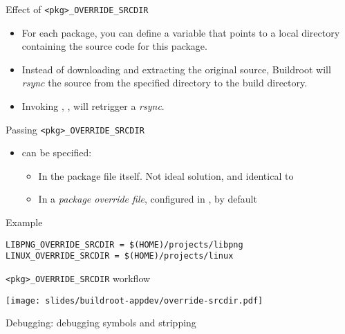 \begin{frame}{Effect of {\tt <pkg>\_OVERRIDE\_SRCDIR}}
  \begin{itemize}
  \item For each package, you can define a
     variable that points to a local
    directory containing the source code for this package.
  \item Instead of downloading and extracting the original source,
    Buildroot will {\em rsync} the source from the specified directory
    to the build directory.
  \item Invoking , ,  will retrigger a
    {\em rsync}.
  \end{itemize}
\end{frame}

\begin{frame}[fragile]{Passing {\tt <pkg>\_OVERRIDE\_SRCDIR}}
  \begin{itemize}
  \item {} can be specified:
    \begin{itemize}
    \item In the package  file itself. Not ideal solution,
      and identical to 
    \item In a {\em package override file}, configured in
      , by default
    \end{itemize}
  \end{itemize}

  \begin{block}{Example }
\begin{verbatim}
LIBPNG_OVERRIDE_SRCDIR = $(HOME)/projects/libpng
LINUX_OVERRIDE_SRCDIR = $(HOME)/projects/linux
\end{verbatim}
  \end{block}
\end{frame}

\begin{frame}{{\tt <pkg>\_OVERRIDE\_SRCDIR} workflow}
  \begin{center}
    \texttt{[image: slides/buildroot-appdev/override-srcdir.pdf]}
  \end{center}
\end{frame}

\begin{frame}{Debugging: debugging symbols and stripping}

\end{frame}

